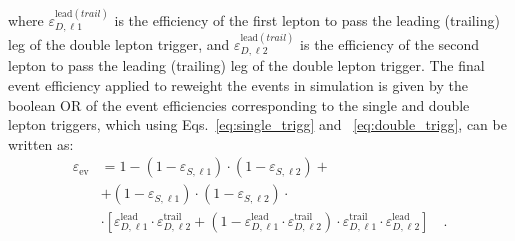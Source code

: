 \noindent where $\varepsilon_{D,\ell1}^{\mathrm{lead}(trail)}$ is the efficiency of the first lepton to pass the leading (trailing) leg of the double lepton trigger, and $\varepsilon_{D,\ell2}^{\mathrm{lead}(trail)}$ is the efficiency of the second lepton to pass the leading (trailing) leg of the double lepton trigger. The final event efficiency applied to reweight the events in simulation is given by the boolean OR of the event efficiencies corresponding to the single and double lepton triggers, which using Eqs.~\eqref{eq:single_trigg} and ~\eqref{eq:double_trigg}, can be written as:
\begin{equation}
\begin{split}
\varepsilon_\mathrm{ev} & = 1 - (1-\varepsilon_{S,\ell1})\cdot(1-\varepsilon_{S,\ell2}) + \\
                     & + (1-\varepsilon_{S,\ell1})\cdot(1-\varepsilon_{S,\ell2}) \cdot \\
                     & \cdot [ \varepsilon_{D,\ell1}^\mathrm{lead} \cdot \varepsilon_{D,\ell2}^\mathrm{trail} + (  1 -  \varepsilon_{D,\ell1}^\mathrm{lead} \cdot \varepsilon_{D,\ell2}^\mathrm{trail})\cdot\varepsilon_{D,\ell1}^\mathrm{trail} \cdot \varepsilon_{D,\ell2}^\mathrm{lead} ] \quad.
\end{split}
\end{equation}




